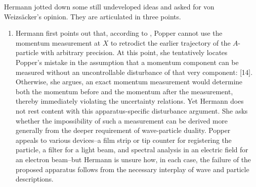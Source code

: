 \documentclass[pdflatex]{sn-jnl}
\newcommand{\vW}{von Weizsäcker\xspace}
\begin{document}
Hermann jotted down some still undeveloped ideas and asked for \vW's opinion. They are articulated in three points.

\begin{enumerate}
\item Hermann first points out that, according to \qm, Popper cannot use the momentum measurement at $X$ to retrodict the earlier trajectory of the $A$-particle with arbitrary precision. At this point, she tentatively locates Popper's mistake in the assumption that a momentum component can be measured without an uncontrollable disturbance of that very component:  [14]. Otherwise, she argues, an exact momentum measurement would determine both the momentum before and the momentum after the measurement, thereby immediately violating the uncertainty relations. Yet Hermann does not rest content with this apparatus-specific disturbance argument. She asks whether the impossibility of such a measurement can be derived more generally from the deeper requirement of wave-particle duality. Popper appeals to various devices--a film strip or tip counter for registering the particle, a filter for a light beam, and spectral analysis in an electric field for an electron beam--but Hermann is unsure how, in each case, the failure of the proposed apparatus follows from the necessary interplay of wave and particle descriptions.


\end{enumerate}
\end{document}
